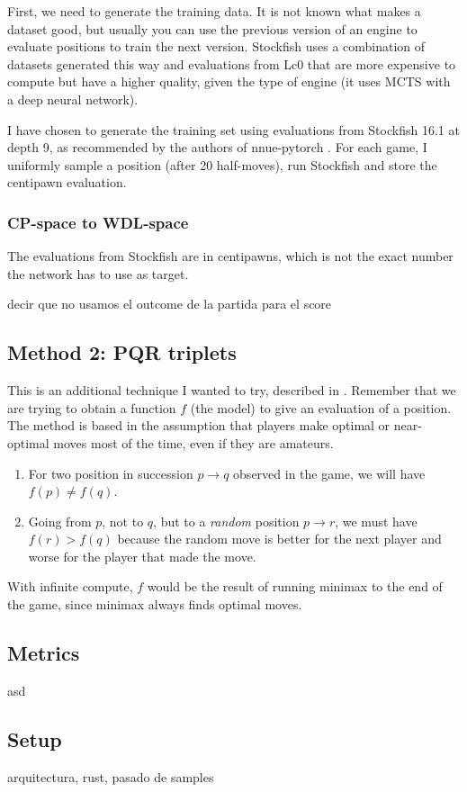 First, we need to generate the training data. It is not known what makes a dataset good, but usually you can use the previous version of an engine to evaluate positions to train the next version. Stockfish uses a combination of datasets generated this way and evaluations from Lc0 that are more expensive to compute but have a higher quality, given the type of engine (it uses MCTS with a deep neural network).

I have chosen to generate the training set using evaluations from Stockfish 16.1 at depth 9, as recommended by the authors of nnue-pytorch \cite{nnue-pytorch}. For each game, I uniformly sample a position (after 20 half-moves), run Stockfish and store the centipawn evaluation.

\setcounter{secnumdepth}{4}
\subsubsection{CP-space to WDL-space}

The evaluations from Stockfish are in centipawns, which is not the exact number the network has to use as target.


decir que no usamos el outcome de la partida para el score


\subsection{Method 2: PQR triplets}

This is an additional technique I wanted to try, described in \cite{dlchess:2014}. Remember that we are trying to obtain a function $f$ (the model) to give an evaluation of a position. The method is based in the assumption that players make optimal or near-optimal moves most of the time, even if they are amateurs.

\begin{enumerate}
\item For two position in succession $p \rightarrow q$  observed in the game, we will have $f(p) \neq f(q)$.
\item Going from $p$, not to $q$, but to a \textit{random} position $p \rightarrow r$, we must have $f(r) > f(q)$ because the random move is better for the next player and worse for the player that made the move.
\end{enumerate}

With infinite compute, $f$ would be the result of running minimax to the end of the game, since minimax always finds optimal moves.

\subsection{Metrics}

asd \cite{nnue:2018}

\subsection{Setup}

arquitectura, rust, pasado de samples
